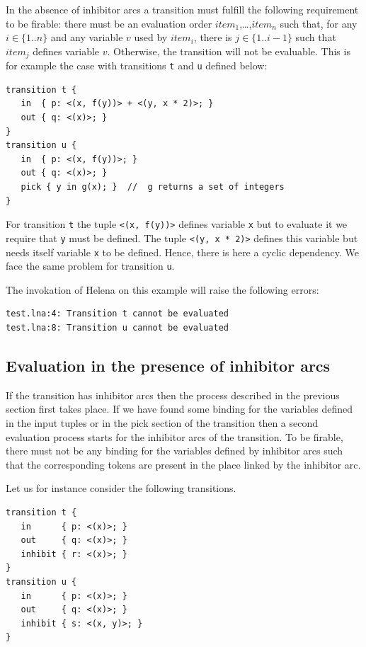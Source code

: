 In the absence of inhibitor arcs a transition must fulfill the
following requirement to be firable: there must be an evaluation order
$item_1$,\ldots,$item_n$ such that, for any $i \in \{1..n\}$ and any
variable $v$ used by $item_i$, there is $j \in \{1..i-1\}$ such that
$item_j$ defines variable $v$.  Otherwise, the transition will not be
evaluable.  This is for example the case with transitions
\lstinline{t} and \lstinline{u} defined below:

\begin{lstlisting}
transition t {
   in  { p: <(x, f(y))> + <(y, x * 2)>; }
   out { q: <(x)>; }
}
transition u {
   in  { p: <(x, f(y))>; }
   out { q: <(x)>; }
   pick { y in g(x); }  //  g returns a set of integers
}
\end{lstlisting}

For transition \lstinline{t} the tuple \lstinline{<(x, f(y))>} defines
variable \lstinline{x} but to evaluate it we require that
\lstinline{y} must be defined.  The tuple \lstinline{<(y, x * 2)>}
defines this variable but needs itself variable \lstinline{x} to be
defined.  Hence, there is here a cyclic dependency.  We face the same
problem for transition \lstinline{u}.

The invokation of Helena on this example will raise the following
errors:
\begin{verbatim}
test.lna:4: Transition t cannot be evaluated
test.lna:8: Transition u cannot be evaluated
\end{verbatim}

\subsection{Evaluation in the presence of inhibitor arcs}
If the transition has inhibitor arcs then the process described in the
previous section first takes place.  If we have found some binding for
the variables defined in the input tuples or in the pick section of
the transition then a second evaluation process starts for the
inhibitor arcs of the transition.  To be firable, there must not be
any binding for the variables defined by inhibitor arcs such that the
corresponding tokens are present in the place linked by the inhibitor
arc.

Let us for instance consider the following transitions.

\begin{lstlisting}
transition t {
   in      { p: <(x)>; }
   out     { q: <(x)>; }
   inhibit { r: <(x)>; }
}
transition u {
   in      { p: <(x)>; }
   out     { q: <(x)>; }
   inhibit { s: <(x, y)>; }
}
\end{lstlisting}

